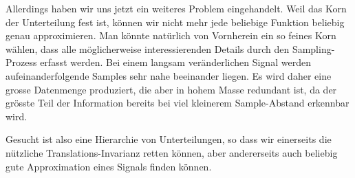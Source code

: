 Allerdings haben wir uns jetzt ein weiteres Problem eingehandelt.
Weil das Korn der Unterteilung fest ist, können wir nicht mehr jede
beliebige Funktion beliebig genau approximieren.
Man könnte natürlich von Vornherein ein so feines Korn wählen, dass alle
möglicherweise interessierenden Details durch den Sampling-Prozess
erfasst werden.
Bei einem langsam veränderlichen Signal werden aufeinanderfolgende Samples
sehr nahe beeinander liegen.
Es wird daher eine grosse Datenmenge produziert, die aber in hohem
Masse redundant ist, da der grösste Teil der Information bereits bei
viel kleinerem Sample-Abstand erkennbar wird.

Gesucht ist also eine Hierarchie von Unterteilungen, so dass wir einerseits
die nützliche Trans\-la\-tions-Invarianz retten können, aber andererseits auch
beliebig gute Approximation eines Signals finden können.



